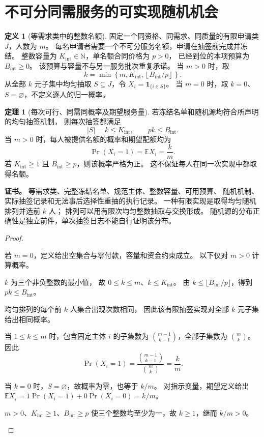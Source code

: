 \documentclass[UTF8,12pt,a4paper,openany,fontset=none,zihao=false]{ctexrep}
\theoremstyle{definition}
\newtheorem{definition}{定义}[chapter]
\newtheorem{theorem}{定理}[chapter]
\newenvironment{certificate}{\par\noindent\textbf{证书。}\ignorespaces}{\par}
\newcommand{\EE}{\mathbb E}
\newcommand{\1}{\mathbf 1}
\begin{document}
\section{不可分同需服务的可实现随机机会}

\begin{definition}[等需求类中的整数名额]
\label{access:indivisible}
固定一个同资格、同需求、同质量的有限申请类 \(J\)，人数为 \(m\)。
每名申请者需要一个不可分服务名额，申请在抽签前完成并冻结。
整数容量为 \(K_{\mathrm{int}}\in\mathbb N\)，单名额合同价格为 \(p>0\)，
已经到位的本项预算为 \(B_{\mathrm{int}}\ge0\)。
该预算与容量不与另一服务批次重复承诺。
当 \(m>0\) 时，取
\[
k=\min\left\{m,K_{\mathrm{int}},
\left\lfloor B_{\mathrm{int}}/p\right\rfloor\right\}.
\]
从全部 \(k\) 元子集中均匀抽取 \(S\subseteq J\)，令 \(X_i=\1_{\{i\in S\}}\)。
当 \(m=0\) 时，取 \(k=0\)、\(S=\varnothing\)，不定义逐人的归一概率。
\end{definition}

\begin{theorem}[每次可行、同需同概率及期望服务量]
\label{access:lottery}
若冻结名单和随机源均符合所声明的均匀抽签机制，
则每次抽签都满足
\[
|S|=k\le K_{\mathrm{int}},\qquad pk\le B_{\mathrm{int}}.
\]
当 \(m>0\) 时，每人被提供名额的概率和期望配额均为
\[
\Pr(X_i=1)=\EE X_i=\frac{k}{m}.
\]
若 \(K_{\mathrm{int}}\ge1\) 且 \(B_{\mathrm{int}}\ge p\)，则该概率严格为正。
这不保证每人在同一次实现中都取得名额。
\end{theorem}
\begin{certificate}
等需求类、完整冻结名单、规范主体、整数容量、可用预算、
随机机制、实际抽签记录和无法事后选择性重抽的执行记录。
一种有限实现是取得均匀随机排列并选前 \(k\) 人；
排列可以用有限次均匀整数抽取与交换形成。
随机源的分布正确性是独立前件，单次抽签日志不能自行证明该分布。
\end{certificate}
\begin{proof}
\begin{semanticsteps}
\item 若 \(m=0\)，定义给出空集合与零付款，容量和资金约束成立。
以下仅对 \(m>0\) 计算概率。
\item \(k\) 为三个非负整数的最小值，
故 \(0\le k\le m\)、\(k\le K_{\mathrm{int}}\)。
由 \(k\le\lfloor B_{\mathrm{int}}/p\rfloor\)，得到 \(pk\le B_{\mathrm{int}}\)。
\item 均匀排列的每个前 \(k\) 人集合出现次数相同，
因此该有限抽签实现对全部 \(k\) 元子集给出相同概率。
\item 当 \(1\le k\le m\) 时，包含固定主体 \(i\) 的子集数为
\(\binom{m-1}{k-1}\)，全部子集数为 \(\binom m k\)。
因此
\[
\Pr(X_i=1)=
\frac{\binom{m-1}{k-1}}{\binom m k}=\frac{k}{m}.
\]
\item 当 \(k=0\) 时，\(S=\varnothing\)，故概率为零，也等于 \(k/m\)。
对指示变量，期望定义给出
\(\EE X_i=1\Pr(X_i=1)+0\Pr(X_i=0)=k/m\)。
\item \(m>0\)、\(K_{\mathrm{int}}\ge1\)、\(B_{\mathrm{int}}\ge p\)
使三个整数均至少为一，故 \(k\ge1\)，继而 \(k/m>0\)。
\end{semanticsteps}
\end{proof}
\end{document}
